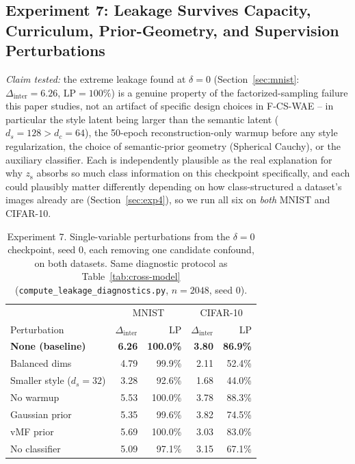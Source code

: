 \documentclass[10pt,letterpaper]{article}
\newcommand{\ours}{F-CS-WAE}
\newcommand{\zs}{z_{\mathrm{s}}}
\begin{document}
\subsection{Experiment 7: Leakage Survives Capacity, Curriculum, Prior-Geometry, and Supervision Perturbations}
\label{sec:exp7}

\emph{Claim tested:} the extreme leakage found at $\delta{=}0$
(Section~\ref{sec:mnist}: $\Delta_{\mathrm{inter}}{=}6.26$, LP$=100\%$) is a
genuine property of the factorized-sampling failure this paper studies, not
an artifact of specific design choices in \ours{} -- in particular the
style latent being larger than the semantic latent
($d_s{=}128{>}d_c{=}64$), the 50-epoch reconstruction-only warmup before any
style regularization, the choice of semantic-prior geometry (Spherical
Cauchy), or the auxiliary classifier. Each is independently plausible as
the real explanation for why $\zs$ absorbs so much class information on
this checkpoint specifically, and each could plausibly matter differently
depending on how class-structured a dataset's images already are
(Section~\ref{sec:exp4}), so we run all six on \emph{both} MNIST and
CIFAR-10.

\begin{table}[t]
\centering
\small
\caption{Experiment 7. Single-variable perturbations from the $\delta{=}0$
         checkpoint, seed 0, each removing one candidate confound, on both
         datasets. Same diagnostic protocol as Table~\ref{tab:cross-model}
         (\texttt{compute\_leakage\_diagnostics.py}, $n{=}2048$, seed 0).}
\label{tab:capacity-audit}
\begin{tabular}{lrrrr}
\toprule
& \multicolumn{2}{c}{MNIST} & \multicolumn{2}{c}{CIFAR-10} \\
Perturbation & $\Delta_{\mathrm{inter}}$ & LP & $\Delta_{\mathrm{inter}}$ & LP \\
\midrule
\textbf{None (baseline)} & \textbf{6.26} & \textbf{100.0\%} & \textbf{3.80} & \textbf{86.9\%} \\
Balanced dims & 4.79 & 99.9\% & 2.11 & 52.4\% \\
Smaller style ($d_s{=}32$) & 3.28 & 92.6\% & 1.68 & 44.0\% \\
No warmup & 5.53 & 100.0\% & 3.78 & 88.3\% \\
Gaussian prior & 5.35 & 99.6\% & 3.82 & 74.5\% \\
vMF prior & 5.69 & 100.0\% & 3.03 & 83.0\% \\
No classifier & 5.09 & 97.1\% & 3.15 & 67.1\% \\
\bottomrule
\end{tabular}
\end{table}
\end{document}
